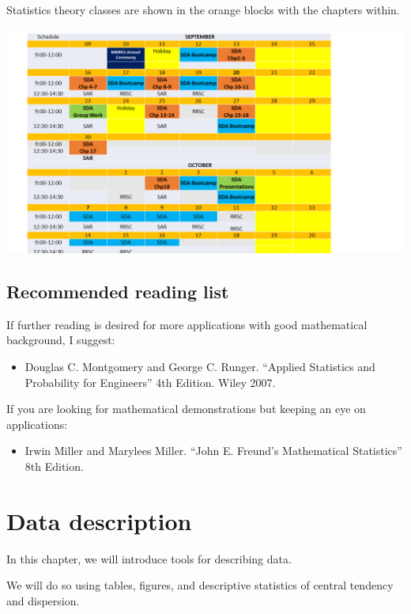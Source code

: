 \documentclass[
]{book}
\providecommand{\tightlist}{%
  \setlength{\itemsep}{0pt}\setlength{\parskip}{0pt}}
\begin{document}
Statistics theory classes are shown in the orange blocks with the chapters within.

\includegraphics{./figures/calendario.png}

\hypertarget{recommended-reading-list}{%
\section{Recommended reading list}\label{recommended-reading-list}}

If further reading is desired for more applications with good mathematical background, I suggest:

\begin{itemize}
\tightlist
\item
  Douglas C. Montgomery and George C. Runger. ``Applied Statistics and Probability for Engineers'' 4th Edition. Wiley 2007.
\end{itemize}

If you are looking for mathematical demonstrations but keeping an eye on applications:

\begin{itemize}
\tightlist
\item
  Irwin Miller and Marylees Miller. ``John E. Freund's Mathematical Statistics'' 8th Edition.
\end{itemize}

\hypertarget{data-description}{%
\chapter{Data description}\label{data-description}}

In this chapter, we will introduce tools for describing data.

We will do so using tables, figures, and descriptive statistics of central tendency and dispersion.
\end{document}
